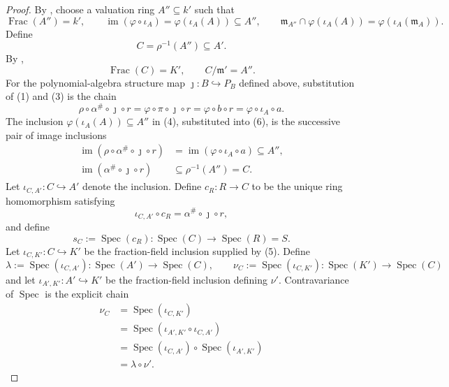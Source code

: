 \begin{proof}
  By
  \cite[\href{https://stacks.math.columbia.edu/tag/00IA}{Tag 00IA}]
  {stacks-project}, choose a valuation ring $A''\subseteq k'$ such that
  \[
    \operatorname{Frac}(A'')=k',\qquad
    \operatorname{im}(\varphi\circ\iota_A)
      =\varphi(\iota_A(A))\subseteq A'',\qquad
    \mathfrak m_{A''}\cap\varphi(\iota_A(A))
      =\varphi(\iota_A(\mathfrak m_A)).                         \tag{4}
  \]
  Define
  \[
    C=\rho^{-1}(A'')\subseteq A'.
  \]
  By ,
  \[
    \operatorname{Frac}(C)=K',
    \qquad C/\mathfrak m'=A''.                                  \tag{5}
  \]
  For the polynomial-algebra structure map
  $\jmath\colon B\hookrightarrow P_B$ defined above, substitution of (1) and
  (3) is the chain
  \[
    \rho\circ\alpha^\#\circ\jmath\circ r
      =\varphi\circ\pi\circ\jmath\circ r
      =\varphi\circ b\circ r
      =\varphi\circ\iota_A\circ a.
                                                                    \tag{6}
  \]
  The inclusion $\varphi(\iota_A(A))\subseteq A''$ in (4), substituted into
  (6), is the successive pair of image inclusions
  \[
  \begin{aligned}
    \operatorname{im}(\rho\circ\alpha^\#\circ\jmath\circ r)
      &=\operatorname{im}(\varphi\circ\iota_A\circ a)
        \subseteq A'',\\
    \operatorname{im}(\alpha^\#\circ\jmath\circ r)
      &\subseteq\rho^{-1}(A'')=C.
  \end{aligned}
  \]
  Let $\iota_{C,A'}\colon C\hookrightarrow A'$ denote the inclusion.  Define
  $c_R\colon R\to C$ to be the unique ring homomorphism satisfying
  \[
    \iota_{C,A'}\circ c_R
      =\alpha^\#\circ\jmath\circ r,
  \]
  and define
  \[
    s_C:=\operatorname{Spec}(c_R)\colon\operatorname{Spec}(C)\to
      \operatorname{Spec}(R)=S.
  \]
  Let $\iota_{C,K'}\colon C\hookrightarrow K'$ be the fraction-field
  inclusion supplied by (5).  Define
  \[
    \lambda:=\operatorname{Spec}(\iota_{C,A'})
      \colon\operatorname{Spec}(A')\to\operatorname{Spec}(C),
    \qquad
    \nu_C:=\operatorname{Spec}(\iota_{C,K'})
      \colon\operatorname{Spec}(K')\to\operatorname{Spec}(C)
  \]
  and let
  \(\iota_{A',K'}\colon A'\hookrightarrow K'\) be the fraction-field
  inclusion defining \(\nu'\).  Contravariance of
  \(\operatorname{Spec}\) is the explicit chain
  \[
  \begin{aligned}
    \nu_C
      &=\operatorname{Spec}(\iota_{C,K'})\\
      &=\operatorname{Spec}
        (\iota_{A',K'}\circ\iota_{C,A'})\\
      &=\operatorname{Spec}(\iota_{C,A'})
          \circ\operatorname{Spec}(\iota_{A',K'})\\
      &=\lambda\circ\nu'.
  \end{aligned}                                                    \tag{DV0}
  \]


\end{proof}
